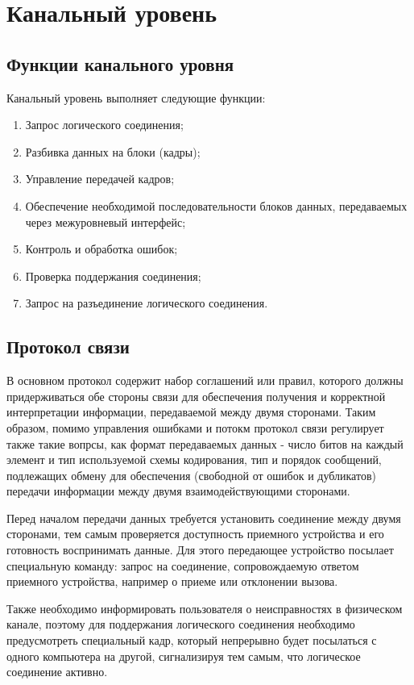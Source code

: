 \documentclass[russian,utf8,simple,emptystyle]{eskdtext}
\begin{document}
\section{Канальный уровень}
\subsection{Функции канального уровня}
Канальный уровень выполняет следующие функции:
\begin{enumerate}
\item Запрос логического соединения;
\item Разбивка данных на блоки (кадры);
\item Управление передачей кадров;
\item Обеспечение необходимой последовательности блоков данных, передаваемых через межуровневый интерфейс;
\item Контроль и обработка ошибок;
\item Проверка поддержания соединения;
\item Запрос на разъединение логического соединения.
\end{enumerate}

\subsection{Протокол связи}
В основном протокол содержит набор соглашений или правил, которого должны придерживаться обе стороны связи для обеспечения получения и корректной интерпретации информации, передаваемой между двумя сторонами. Таким образом, помимо управления ошибками и потокм протокол связи регулирует также такие вопрсы, как формат передаваемых данных - число битов на каждый элемент и тип используемой схемы кодирования, тип и порядок сообщений, подлежащих обмену для обеспечения (свободной от ошибок и дубликатов) передачи информации между двумя взаимодействующими сторонами.

Перед началом передачи данных требуется установить соединение между двумя сторонами, тем самым проверяется доступность приемного устройства и его готовность воспринимать данные. Для этого передающее устройство посылает специальную команду: запрос на соединение, сопровождаемую ответом приемного устройства, например о приеме или отклонении вызова.

Также необходимо информировать пользователя о неисправностях в физическом канале, поэтому для поддержания логического соединения необходимо предусмотреть специальный кадр, который непрерывно будет посылаться с одного компьютера на другой, сигнализируя тем самым, что логическое соединение активно.
\end{document}
